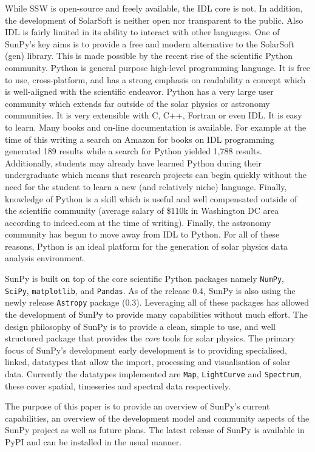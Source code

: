 While SSW is open-source and freely available, the IDL core is not. In addition, the development
of SolarSoft is neither open nor transparent to the public. Also IDL is fairly limited in 
its ability to interact with other languages. One of SunPy's key aims is to 
provide a free and modern alternative to the SolarSoft (gen) library. This is made possible
by the recent rise of the scientific Python community. Python is general purpose 
high-level programming language. It is free to use, cross-platform, and has a strong
emphasis on readability a concept which is well-aligned with the scientific endeavor.
Python has a very large user community which extends far outside of the solar physics
or astronomy communities. It is very extensible with C, C++, Fortran or even IDL. It is 
easy to learn. Many books and on-line documentation is available. For example at the time
of this writing a search on Amazon for books on IDL programming generated 189 results while a search
for Python yielded 1,788 results. Additionally, students may already have learned Python during their 
undergraduate which means that research projects can begin quickly without the need for 
the student to learn a new (and relatively niche) language. Finally, knowledge of Python is a skill which is useful
and well compensated outside of the scientific community (average salary of \$110k in Washington DC area according
to indeed.com at the time of writing). Finally, the astronomy community has begun to
move away from IDL to Python. For all of these reasons, Python is an ideal platform for
the generation of solar physics data analysis environment.

SunPy is built on top of the core scientific Python packages namely \texttt{NumPy}, \texttt{SciPy}, 
\texttt{matplotlib}, and \texttt{Pandas}. As of the release 0.4, SunPy is also using the 
newly release \texttt{Astropy} package (0.3). Leveraging all of these packages has allowed 
the development of SunPy to provide many capabilities without much effort. The design
philosophy of SunPy is to provide a clean, simple to use, and well structured 
package that provides the \textit{core} tools for solar physics.
The primary focus of SunPy's development early development is to providing specialised, 
linked, datatypes that allow the import, processing and visualisation of solar 
data. Currently the datatypes implemented are \texttt{Map}, \texttt{LightCurve} 
and \texttt{Spectrum}, these cover spatial, timeseries and spectral data 
respectively.

The purpose of this paper is to provide an overview of SunPy's current capabilities, an 
overview of the development model and community aspects of the SunPy project
as well as future plans. The latest release of SunPy is available in 
PyPI and can be installed in the usual manner.

